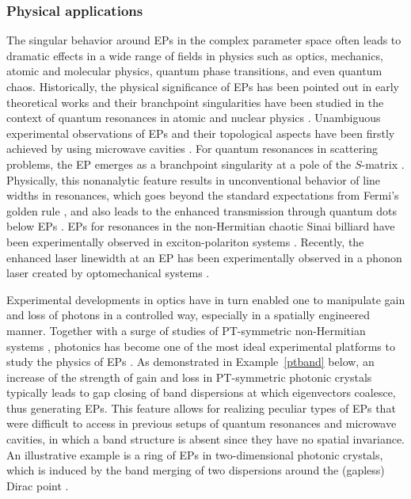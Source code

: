 \documentclass{tADP2e}
\theoremstyle{plain}
\theoremstyle{plain}
\theoremstyle{definition}
\begin{document}
\subsubsection{Physical applications\label{secepphys}}
The singular behavior around EPs in the complex parameter space  often leads to dramatic effects in a wide range of fields in physics such as optics, mechanics, atomic and molecular physics, quantum phase transitions, and even quantum chaos.
Historically, the physical significance of EPs has been pointed out in early theoretical works \cite{Pancharatnam1958,Berry_1998,Heiss1999} and their branchpoint singularities have been studied in the context of quantum resonances in atomic and nuclear physics \cite{NM98}. 
Unambiguous experimental observations of EPs and their topological aspects have been firstly achieved by using microwave cavities \cite{PE00,DC01,DC03}.  For quantum resonances in scattering problems, the EP emerges as a branchpoint singularity at a pole of the $S$-matrix \cite{NRG02}. Physically, this nonanalytic feature results in unconventional behavior of line widths in resonances, which goes beyond the standard expectations from Fermi's golden rule \cite{RI00}, and also leads to the enhanced transmission through quantum dots below EPs \cite{AKM05,LYA00}. EPs for resonances in the non-Hermitian chaotic Sinai billiard have been experimentally observed in exciton-polariton systems \cite{GT15}. Recently, the enhanced laser linewidth at an EP \cite{KP79} has been experimentally observed in a phonon laser created by optomechanical systems \cite{ZJ18}.

Experimental developments in optics have in turn enabled one to manipulate gain and loss of photons in a controlled way, especially in a spatially engineered manner.
Together with a surge of studies of PT-symmetric non-Hermitian systems \cite{BCM98,AZ01,AZ012,PD07}, photonics has become one of the most ideal experimental platforms to study the physics of EPs \cite{REG07,KGM08,KS082,LSS10,DK15,ZB15,CA16}. As demonstrated in Example~\ref{ptband} below, an increase of the strength of gain and loss in PT-symmetric photonic crystals typically leads to gap closing of band dispersions at which eigenvectors coalesce, thus generating EPs. This feature allows for realizing peculiar types of EPs that were difficult to access in previous setups of quantum resonances and microwave cavities, in which a band structure is absent since they have no spatial invariance. An illustrative example is a ring of EPs in two-dimensional photonic crystals, which is induced by the band merging of two dispersions around the (gapless) Dirac point \cite{ZB15}. 
 
\end{document}
